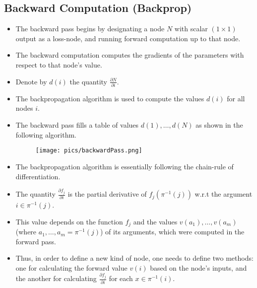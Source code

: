 \subsection{Backward Computation (Backprop)}
\begin{itemize}

\item The backward pass begins by designating a node $N$ with scalar $(1\times1)$ output as a loss-node, and running forward computation up to that node.

\item The backward computation computes the gradients of the parameters with respect to that node's value.


\item Denote by $d(i)$  the quantity $\frac{\partial N}{ \partial i}$.

\item The backpropagation algorithm is used to compute the values $d(i)$  for all nodes $i$.

\item The backward pass fills a table of values $d(1), \dots, d(N)$  as shown in the following algorithm.

 \begin{figure}[htb]
	\centering
	 \texttt{[image: pics/backwardPass.png]}
\end{figure}

\item The backpropagation algorithm is essentially following the chain-rule of differentiation.

\item The quantity  $\frac{\partial f_j}{ \partial i}$ is the partial derivative of $f_j(\pi^{-1}(j))$ w.r.t the argument $i \in \pi^{-1}(j)$.

\item This value depends on the function $f_j$ and the values $v(a_1), \dots, v(a_m)$  (where $a_1, \dots, a_m =  \pi^{-1}(j)$) of its arguments, which were computed in the forward pass.


\item Thus, in order to define a new kind of node, one needs to define two methods: one for calculating the forward value $v(i)$  based on the node's inputs, and the another for calculating  $\frac{\partial f_j}{ \partial i}$ for each $x \in \pi^{-1}(i)$.

\end{itemize}


